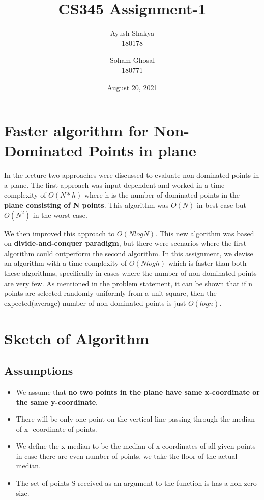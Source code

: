 \documentclass{article}
\title{CS345 Assignment-1}
\author{Ayush Shakya \\180178 \and Soham Ghosal \\180771}
\date{August 20, 2021}
\begin{document}
\maketitle

\section{Faster algorithm for Non-Dominated Points in plane}
In the lecture two approaches were discussed to evaluate non-dominated points in a plane. The first approach was input dependent and worked in a time-complexity of $O(N*h)$ where h is the number of dominated points in the \textbf{plane consisting of N points}. This algorithm was $O(N)$ in best case but $O(N^2)$ in the worst case.
\par
We then improved this approach to $O(NlogN)$. This new algorithm was based on \textbf{divide-and-conquer paradigm}, but there were scenarios where the first algorithm could outperform the second algorithm. In this assignment, we devise an algorithm with a time complexity of $O(Nlogh)$ which is faster than both these algorithms, specifically in cases where the number of non-dominated points are very few. As mentioned in the problem statement, it can be shown that if n points are selected randomly uniformly from a unit square, then the expected(average) number of non-dominated points is just $O(log n)$.

\section{Sketch of Algorithm}

\subsection{Assumptions}
\begin{itemize}
    \item We assume that \textbf{no two points in the plane have same x-coordinate or the same y-coordinate}.
    \item There will be only one point on the vertical line passing through the median of x- coordinate of points.
    \item We define the x-median to be the median of x coordinates of all given points-in case there are even number of points, we take the floor of the actual median.
    \item The set of points S received as an argument to the function is has a non-zero size.
\end{itemize}
\end{document}
